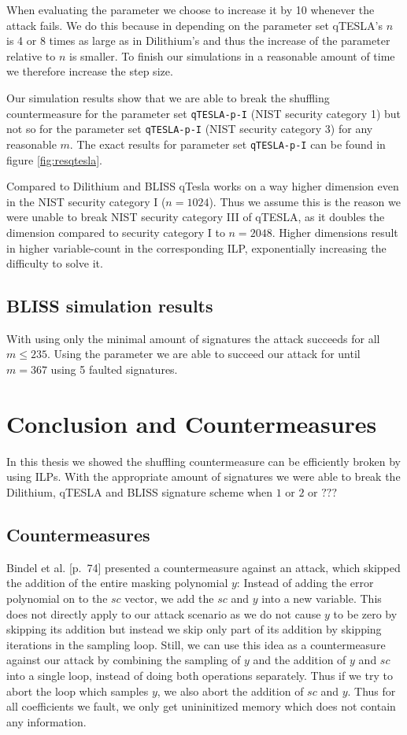 \documentclass[a4paper,titlepage]{article}
\begin{document}
When evaluating the parameter we choose to increase it by 10 whenever the attack fails. We do this because in depending on the parameter set qTESLA's $n$ is 4 or 8 times as large as in Dilithium's and thus the increase of the parameter relative to $n$ is smaller. To finish our simulations in a reasonable amount of time we therefore increase the step size.

Our simulation results show that we are able to break the shuffling countermeasure for the parameter set \texttt{qTESLA-p-I} (NIST security category 1) but not so for the parameter set  \texttt{qTESLA-p-I}  (NIST security category 3) for any reasonable $m$.
The exact results for parameter set  \texttt{qTESLA-p-I}  can be found in figure \ref{fig:resqtesla}.
 
Compared to Dilithium and BLISS qTesla works on a way higher dimension even in the NIST security category I ($n = 1024$). Thus we assume this is the reason we were unable to break NIST security category III of qTESLA, as it doubles the dimension compared to security category I to $n = 2048$. Higher dimensions result in higher variable-count in the corresponding ILP, exponentially increasing the difficulty to solve it.

\subsection{BLISS simulation results}
With using only the minimal amount of signatures the attack succeeds for all $m \leq 235$. Using the  parameter we are able to succeed our attack for until $m = 367$ using 5 faulted signatures.




\section{Conclusion and Countermeasures}
In this thesis we showed the shuffling countermeasure can be efficiently broken by using ILPs. With the appropriate amount of signatures we were able to break the Dilithium, qTESLA and BLISS signature scheme when $1$ or $2$ or $???$ 

\subsection{Countermeasures}
Bindel et al. \cite{sensitivity}[p.~74] presented a countermeasure against an attack, which skipped the addition of the entire masking polynomial $y$: Instead of adding the error polynomial on to the $sc$ vector, we add the $sc$ and $y$ into a new variable. This does not directly apply to our attack scenario as we do not cause $y$ to be zero by skipping its addition but instead we skip only part of its addition by skipping iterations in the sampling loop. Still, we can use this idea as a countermeasure against our attack by combining the sampling of $y$ and the addition of $y$ and $sc$ into a single loop, instead of doing both operations separately. Thus if we try to abort the loop which samples $y$, we also abort the addition of $sc$ and $y$. Thus for all coefficients we fault, we only get unininitized memory which does not contain any information.
\end{document}
